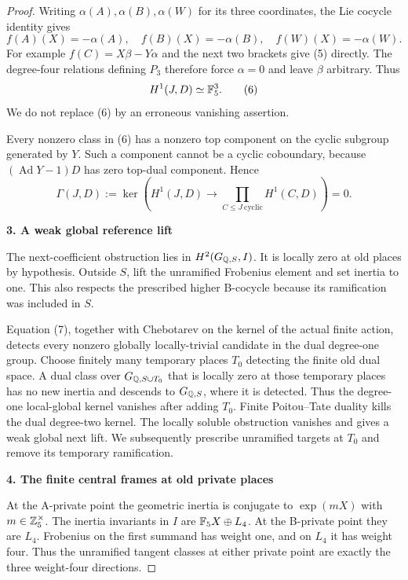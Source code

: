 \begin{proof}
Writing $\alpha(A),\alpha(B),\alpha(W)$ for its three coordinates, the Lie cocycle identity gives
\[
 f(A)(X)=-\alpha(A),\quad
 f(B)(X)=-\alpha(B),\quad
 f(W)(X)=-\alpha(W).
 \tag{5}
\]
For example $f(C)=X\beta-Y\alpha$ and the next two brackets give (5) directly. The degree-four relations defining $P_3$ therefore force $\alpha=0$ and leave $\beta$ arbitrary. Thus
\[
 H^1(J,D)\simeq\mathbb F_5^3.
 \tag{6}
\]
We do not replace (6) by an erroneous vanishing assertion.

Every nonzero class in (6) has a nonzero top component on the cyclic subgroup generated by $Y$. Such a component cannot be a cyclic coboundary, because $(\operatorname{Ad}Y-1)D$ has zero top-dual component. Hence
\[
 \Gamma(J,D):=
 \ker\!\left(H^1(J,D)\longrightarrow
 \prod_{C\le J\ \mathrm{cyclic}}H^1(C,D)\right)=0.
 \tag{7}
\]

\par\medskip\noindent\textbf{3. A weak global reference lift}\par\nobreak\smallskip
The next-coefficient obstruction lies in $H^2(G_{\mathbb Q,S},I)$. It is locally zero at old places by hypothesis. Outside $S$, lift the unramified Frobenius element and set inertia to one. This also respects the prescribed higher B-cocycle because its ramification was included in $S$.

Equation (7), together with Chebotarev on the kernel of the actual finite action, detects every nonzero globally locally-trivial candidate in the dual degree-one group. Choose finitely many temporary places $T_0$ detecting the finite old dual space. A dual class over $G_{\mathbb Q,S\cup T_0}$ that is locally zero at those temporary places has no new inertia and descends to $G_{\mathbb Q,S}$, where it is detected. Thus the degree-one local-global kernel vanishes after adding $T_0$. Finite Poitou--Tate duality kills the dual degree-two kernel. The locally soluble obstruction vanishes and gives a weak global next lift. We subsequently prescribe unramified targets at $T_0$ and remove its temporary ramification.

\par\medskip\noindent\textbf{4. The finite central frames at old private places}\par\nobreak\smallskip
At the A-private point the geometric inertia is conjugate to $\exp(mX)$ with $m\in\mathbb Z_5^\times$. The inertia invariants in $I$ are $\mathbb F_5X\oplus L_4$. At the B-private point they are $L_4$. Frobenius on the first summand has weight one, and on $L_4$ it has weight four. Thus the unramified tangent classes at either private point are exactly the three weight-four directions.


\end{proof}

